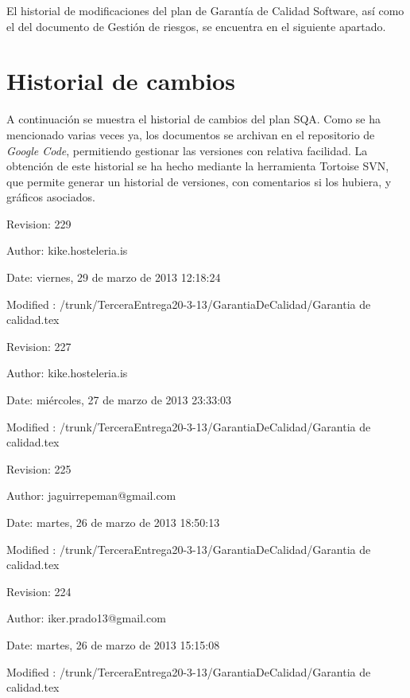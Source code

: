 \documentclass[spanish,a4paper,11pt, twoside]{report}	%
\begin{document}
	El historial de modificaciones del plan de Garantía de Calidad Software, así como el del documento de Gestión de riesgos, se encuentra en el siguiente apartado.

	\section{Historial de cambios}
	
	A continuación se muestra el historial de cambios del plan SQA. Como se ha mencionado varias veces ya, los documentos se archivan en el repositorio de \textit{Google Code}, permitiendo gestionar las versiones con relativa facilidad. La obtención de este historial se ha hecho mediante la herramienta Tortoise SVN, que permite generar un historial de versiones, con comentarios si los hubiera, y gráficos asociados.

	\vspace{0.25cm}

	Revision: 229
	
	Author: kike.hosteleria.is
	
	Date: viernes, 29 de marzo de 2013 12:18:24
	
	Modified : /trunk/TerceraEntrega20-3-13/GarantiaDeCalidad/Garantia de calidad.tex

	\vspace{0.25cm}

	Revision: 227
	
	Author: kike.hosteleria.is		
	
	Date: miércoles, 27 de marzo de 2013 23:33:03
	
	Modified : /trunk/TerceraEntrega20-3-13/GarantiaDeCalidad/Garantia de calidad.tex

	\vspace{0.25cm}

	Revision: 225
	
	Author: jaguirrepeman@gmail.com
	
	Date: martes, 26 de marzo de 2013 18:50:13
	
	Modified : /trunk/TerceraEntrega20-3-13/GarantiaDeCalidad/Garantia de calidad.tex

	\vspace{0.25cm}

	Revision: 224
	
	Author: iker.prado13@gmail.com
	
	Date: martes, 26 de marzo de 2013 15:15:08
	
	Modified : /trunk/TerceraEntrega20-3-13/GarantiaDeCalidad/Garantia de calidad.tex
\end{document}
